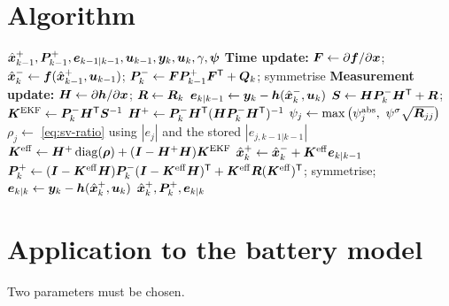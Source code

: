\section{Algorithm}
\begin{algorithm}[H]
\caption{SVSF (SVSF-KF form) --- one sampling period}
\begin{algorithmic}[1]
\Require $\hat{\bm{x}}^{+}_{k-1},\bm{P}^{+}_{k-1},\bm{e}_{k-1|k-1},\bm{u}_{k-1},\bm{y}_k,\bm{u}_k,\gamma,\bm\psi$
\State \textbf{Time update:} $\bm{F}\gets\partial\bm{f}/\partial\bm{x}$;\;
  $\hat{\bm{x}}^{-}_k\gets\bm{f}(\hat{\bm{x}}^{+}_{k-1},\bm{u}_{k-1})$;\;
  $\bm{P}^{-}_k\gets\bm{F}\bm{P}^{+}_{k-1}\bm{F}^{\mathsf{T}}+\bm{Q}_k$; symmetrise
\State \textbf{Measurement update:} $\bm{H}\gets\partial\bm{h}/\partial\bm{x}$;\; $\bm{R}\gets\bm{R}_k$
\State $\bm{e}_{k|k-1}\gets\bm{y}_k-\bm{h}(\hat{\bm{x}}^{-}_k,\bm{u}_k)$ 
\State $\bm{S}\gets\bm{H}\bm{P}^{-}_k\bm{H}^{\mathsf{T}}+\bm{R}$;\quad
  $\bm{K}^{\mathrm{EKF}}\gets\bm{P}^{-}_k\bm{H}^{\mathsf{T}}\bm{S}^{-1}$
\State $\bm{H}^{+}\gets\bm{P}^{-}_k\bm{H}^{\mathsf{T}}(\bm{H}\bm{P}^{-}_k\bm{H}^{\mathsf{T}})^{-1}$ 
  \State $\psi_j\gets\max\big(\psi^{\mathrm{abs}}_j,\ \psi^{\sigma}\sqrt{\mR_{jj}}\big)$
  \State $\rho_j\gets$ \eqref{eq:sv-ratio} using $|e_{j}|$ and the stored $|e_{j,k-1|k-1}|$
\EndFor
\State $\bm{K}^{\mathrm{eff}}\gets\bm{H}^{+}\operatorname{diag}(\bm\rho)+(\bm{I}-\bm{H}^{+}\bm{H})\bm{K}^{\mathrm{EKF}}$
\State $\hat{\bm{x}}^{+}_k\gets\hat{\bm{x}}^{-}_k+\bm{K}^{\mathrm{eff}}\bm{e}_{k|k-1}$
\State $\bm{P}^{+}_k\gets(\bm{I}-\bm{K}^{\mathrm{eff}}\bm{H})\bm{P}^{-}_k(\bm{I}-\bm{K}^{\mathrm{eff}}\bm{H})^{\mathsf{T}}
       +\bm{K}^{\mathrm{eff}}\bm{R}(\bm{K}^{\mathrm{eff}})^{\mathsf{T}}$; symmetrise; 
\State $\bm{e}_{k|k}\gets\bm{y}_k-\bm{h}(\hat{\bm{x}}^{+}_k,\bm{u}_k)$ 
\Ensure $\hat{\bm{x}}^{+}_k,\bm{P}^{+}_k,\bm{e}_{k|k}$
\end{algorithmic}
\end{algorithm}

\section{Application to the battery model}
Two parameters must be chosen.


